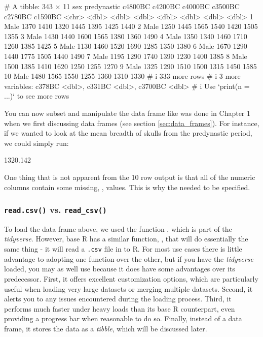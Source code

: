 \begin{outR}
# A tibble: 343 × 11
   sex   predynastic c4800BC c4200BC c4000BC c3500BC c2780BC c1590BC
   <chr>       <dbl>   <dbl>   <dbl>   <dbl>   <dbl>   <dbl>   <dbl>
 1 Male         1370    1410    1320    1445    1395    1425    1440
 2 Male         1250    1445    1565    1540    1420    1505    1355
 3 Male         1430    1440    1600    1565    1380    1360    1490
 4 Male         1350    1340    1460    1710    1260    1385    1425
 5 Male         1130    1460    1520    1690    1285    1350    1380
 6 Male         1670    1290    1440    1775    1505    1440    1490
 7 Male         1195    1290    1740    1390    1230    1400    1385
 8 Male         1500    1385    1410    1620    1250    1255    1270
 9 Male         1325    1290    1510    1500    1315    1450    1585
10 Male         1480    1565    1550    1255    1360    1310    1330
# i 333 more rows
# i 3 more variables: c378BC <dbl>, c331BC <dbl>, c3700BC <dbl>
# i Use `print(n = ...)` to see more rows
\end{outR}

You can now subset and manipulate the data frame  like was done in Chapter 1 when we first discussing data frames (see section \ref{sec:data_frames}). For instance, if we wanted to look at the mean breadth of skulls from the predynastic period, we could simply run:

\begin{outR}
[1] 1320.142
\end{outR}

\noindent
One thing that is not apparent from the 10 row output is that all of the numeric columns contain some missing, , values. This is why the  needed to be specified.

\subsubsection{\texttt{read.csv()} vs. \texttt{read\_csv()}}

To load the  data frame above, we used the function , which is part of the \textit{tidyverse}. However, base R has a similar function, , that will do essentially the same thing - it will read a \texttt{.csv} file in to R. For most use cases there is little advantage to adopting one function over the other, but if you have the \textit{tidyverse} loaded, you may as well use  because it does have some advantages over its predecessor. First, it offers excellent customization options, which are particularly useful when loading very large datasets or merging multiple datasets. Second, it alerts you to any issues encountered during the loading process. Third, it performs much faster under heavy loads than its base R counterpart, even providing a progress bar when reasonable to do so. Finally, instead of a data frame, it stores the data as a \textit{tibble}, which will be discussed later.

